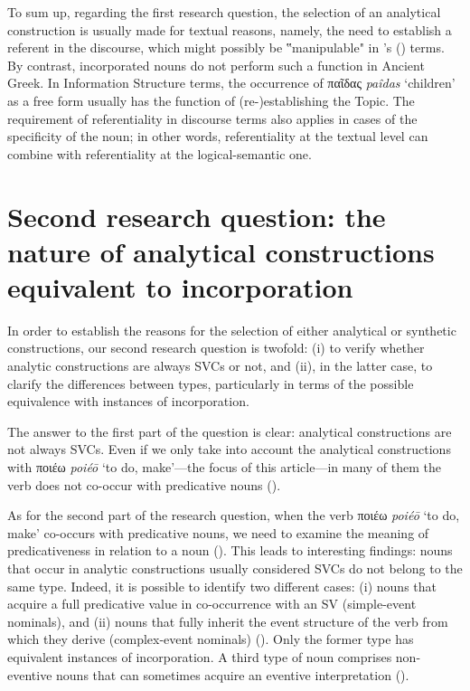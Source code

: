 \documentclass[output=paper,colorlinks,citecolor=brown]{langscibook}
\begin{document}
To sum up, regarding the first research question, the selection of an analytical construction is usually made for textual reasons, namely, the need to establish a referent in the discourse, which might possibly be ‟manipulable" in \citeauthor{HopperThompson1984}'s (\citeyear[711--713]{HopperThompson1984}) terms. By contrast, incorporated nouns do not perform such a function in Ancient Greek. In Information Structure terms, the occurrence of παῖδας \textit{paîdas} `children' as a free form usually has the function of (re-)establishing the Topic. The requirement of referentiality in discourse terms also applies in cases of the specificity of the noun; in other words, referentiality at the textual level can combine with referentiality at the logical-semantic one.

\section{Second research question: the nature of analytical constructions equivalent to incorporation}\label{Section3}

In order to establish the reasons for the selection of either analytical or synthetic constructions, our second research question is twofold: (i) to verify whether analytic constructions are always SVCs or not, and (ii), in the latter case, to clarify the differences between types, particularly in terms of the possible equivalence with instances of incorporation. 

The answer to the first part of the question is clear: analytical constructions are not always SVCs. Even if we only take into account the analytical constructions with ποιέω \textit{poiéō} `to do, make'---the focus of this article---in many of them the verb does not co-occur with predicative nouns ().

As for the second part of the research question, when the verb ποιέω \textit{poiéō} `to do, make' co-occurs with predicative nouns, we need to examine the meaning of predicativeness in relation to a noun (). This leads to interesting findings: nouns that occur in analytic constructions usually considered SVCs do not belong to the same type. Indeed, it is possible to identify two different cases: (i) nouns that acquire a full predicative value in co-occurrence with an SV (simple-event nominals), and (ii) nouns that fully inherit the event structure of the verb from which they derive (complex-event nominals) (). Only the former type has equivalent instances of incorporation. A third type of noun comprises non-eventive nouns that can sometimes acquire an eventive interpretation ().
\end{document}
